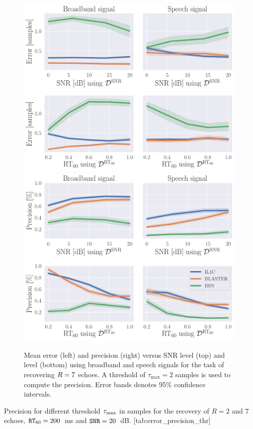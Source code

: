 \begin{figure}[ht]
    \centering
    \begin{fullwidth}
        \includegraphics[width=.49\textwidth]{figures/blaster/e_k-7_thr-2_bns_crocco_blaster.pdf}
        \includegraphics[width=.49\textwidth]{figures/blaster/p_k-7_thr-2_bns_crocco_blaster.pdf}
        \caption{%
            \label{fig:error_precision_snr_rt}
            Mean error (left) and precision (right) versus SNR level (top) and \RT{} level (bottom) using broadband and speech signals for the task of recovering $R=7$ echoes. A threshold of $\tau_{\textrm{max}}=2$ samples is used to compute the precision.
            Error bands denotes 95\% confidence intervals.
        }

    \end{fullwidth}
\end{figure}

\begin{table}[ht]
    \begin{sidecaption}[]{
        Precision for different threshold $\tau_\text{max}$ in samples for the recovery of $R = 2$ and $7$ echoes, $\mathtt{RT}_{60} = 200$~ms and $\mathtt{SNR} = 20$~dB.
    }[tab:error_precision_thr]
    \centering
    \footnotesize
    
    \end{sidecaption}
\end{table}

